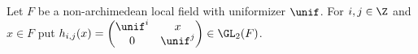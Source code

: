 Let $F$ be a non-archimedean local field with uniformizer $\unif$. For $i,j\in\Z$ and $x\in F$ put $h_{i,j}(x)=\begin{pmatrix}\unif^i&x\\0&\unif^j\end{pmatrix}\in\GL_2(F)$.
